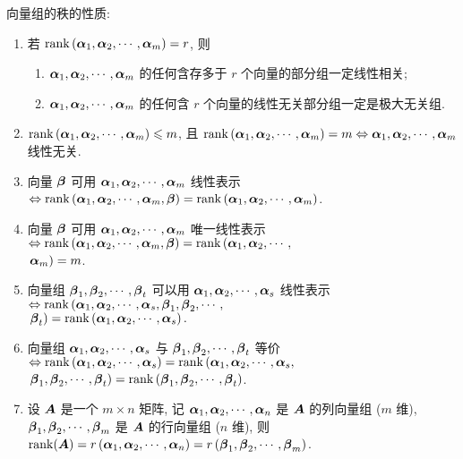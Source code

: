 向量组的秩的性质:
\begin{enumerate}[label=(\arabic{*})]
    \item 若 $ \rank\left(\vb*{\alpha}_{1}, \vb*{\alpha}_{2}, \cdots, \vb*{\alpha}_{m}\right)=r $, 则
    \begin{enumerate}
        \item $\vb*{\alpha}_{1}, \vb*{\alpha}_{2}, \cdots, \vb*{\alpha}_{m} $ 的任何含存多于 $ r $ 个向量的部分组一定线性相关;
        \item $ \vb*{\alpha}_{1}, \vb*{\alpha}_{2}, \cdots, \vb*{\alpha}_{m} $ 的任何含 $ r $ 个向量的线性无关部分组一定是极大无关组.
    \end{enumerate}
    \item $\rank\left(\vb*{\alpha}_{1}, \vb*{\alpha}_{2}, \cdots, \vb*{\alpha}_{m}\right) \leqslant m $, 且 $ \rank\left(\vb*{\alpha}_{1}, \vb*{\alpha}_{2}, \cdots, \vb*{\alpha}_{m}\right)=m \Leftrightarrow \vb*{\alpha}_{1}, \vb*{\alpha}_{2}, \cdots, \vb*{\alpha}_{m} $ 线性无关.
    \item 向量 $ \vb*{\beta} $ 可用 $ \vb*{\alpha}_{1}, \vb*{\alpha}_{2}, \cdots, \vb*{\alpha}_{m} $ 线性表示 $ \Leftrightarrow \rank\left(\vb*{\alpha}_{1}, \vb*{\alpha}_{2}, \cdots, \vb*{\alpha}_{m}, \vb*{\beta}\right)=\rank\left(\vb*{\alpha}_{1}, \vb*{\alpha}_{2}, \cdots, \vb*{\alpha}_{m}\right) $.
    \item 向量 $ \vb*{\beta} $ 可用 $ \vb*{\alpha}_{1}, \vb*{\alpha}_{2}, \cdots, \vb*{\alpha}_{m} $ 唯一线性表示 $ \Leftrightarrow \rank\left(\vb*{\alpha}_{1}, \vb*{\alpha}_{2}, \cdots, \vb*{\alpha}_{m}, \vb*{\beta}\right)=\rank\left(\vb*{\alpha}_{1},\vb*{\alpha}_{2}, \cdots,\right.$\\ $\left.  \vb*{\alpha}_{m}\right)=m $.
    \item 向量组 $ \vb*{\beta}_{1}, \vb*{\beta}_{2}, \cdots, \vb*{\beta}_{t} $ 可以用 $ \vb*{\alpha}_{1}, \vb*{\alpha}_{2}, \cdots, \vb*{\alpha}_{s} $ 线性表示 $ \Leftrightarrow \rank\left(\vb*{\alpha}_{1}, \vb*{\alpha}_{2}, \cdots, \vb*{\alpha}_{s}, \vb*{\beta}_{1}, \vb*{\beta}_{2}, \cdots,\right.$\\$ \left.\vb*{\beta}_{t}\right)=\rank\left(\vb*{\alpha}_{1}, \vb*{\alpha}_{2}, \cdots, \vb*{\alpha}_{s}\right) .$
    \item 向量组 $ \vb*{\alpha}_{1}, \vb*{\alpha}_{2}, \cdots, \vb*{\alpha}_{s} $ 与 $ \vb*{\beta}_{1}, \vb*{\beta}_{2}, \cdots, \vb*{\beta}_{t} $ 等价 $ \Leftrightarrow \rank\left(\vb*{\alpha}_{1}, \vb*{\alpha}_{2}, \cdots, \vb*{\alpha}_{s}\right)=\rank\left(\vb*{\alpha}_{1}, \vb*{\alpha}_{2}, \cdots, \vb*{\alpha}_{s},\right.$\\$\left. \vb*{\beta}_{1}, \vb*{\beta}_{2}, \cdots, \vb*{\beta}_{t}\right)=\rank\left(\vb*{\beta}_{1}, \vb*{\beta}_{2}, \cdots, \vb*{\beta}_{t}\right) $.
    \item 设 $ \vb*{A} $ 是一个 $ m \times n $ 矩阵, 记 $ \vb*{\alpha}_{1}, \vb*{\alpha}_{2}, \cdots, \vb*{\alpha}_{n} $ 是 $ \vb*{A} $ 的列向量组 ($m$ 维), $ \vb*{\beta}_{1}, \vb*{\beta}_{2}, \cdots ,  \vb*{\beta}_{m} $ 是 $ \vb*{A} $ 的行向量组 ($n$ 维), 则 $ \rank(\vb*{A})=r\left(\vb*{\alpha}_{1}, \vb*{\alpha}_{2}, \cdots, \vb*{\alpha}_{n}\right)=r\left(\vb*{\beta}_{1}, \vb*{\beta}_{2}, \cdots, \vb*{\beta}_{m}\right) $.
\end{enumerate}

